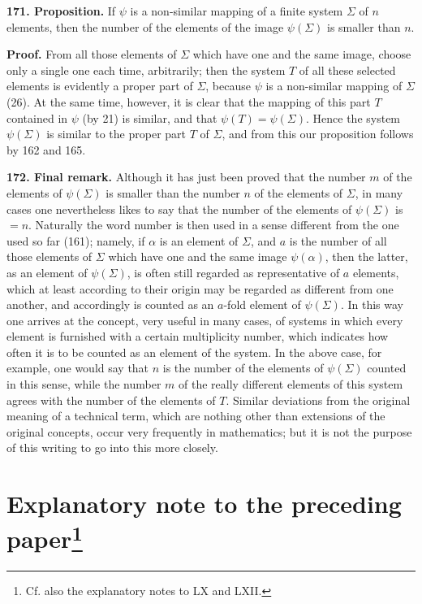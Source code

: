 \documentclass[11pt]{article}
\begin{document}
\noindent\textbf{171. Proposition.} If $\psi$ is a non-similar mapping of a finite system $\Sigma$ of $n$ elements, then the number of the elements of the image $\psi(\Sigma)$ is smaller than $n$.

\noindent\textbf{Proof.} From all those elements of $\Sigma$ which have one and the same image, choose only a single one each time, arbitrarily; then the system $T$ of all these selected elements is evidently a proper part of $\Sigma$, because $\psi$ is a non-similar mapping of $\Sigma$ (26). At the same time, however, it is clear that the mapping of this part $T$ contained in $\psi$ (by 21) is similar, and that $\psi(T)=\psi(\Sigma)$. Hence the system $\psi(\Sigma)$ is similar to the proper part $T$ of $\Sigma$, and from this our proposition follows by 162 and 165.

\noindent\textbf{172. Final remark.} Although it has just been proved that the number $m$ of the elements of $\psi(\Sigma)$ is smaller than the number $n$ of the elements of $\Sigma$, in many cases one nevertheless likes to say that the number of the elements of $\psi(\Sigma)$ is $=n$. Naturally the word number is then used in a sense different from the one used so far (161); namely, if $\alpha$ is an element of $\Sigma$, and $a$ is the number of all those elements of $\Sigma$ which have one and the same image $\psi(\alpha)$, then the latter, as an element of $\psi(\Sigma)$, is often still regarded as representative of $a$ elements, which at least according to their origin may be regarded as different from one another, and accordingly is counted as an $a$-fold element of $\psi(\Sigma)$. In this way one arrives at the concept, very useful in many cases, of systems in which every element is furnished with a certain multiplicity number, which indicates how often it is to be counted as an element of the system. In the above case, for example, one would say that $n$ is the number of the elements of $\psi(\Sigma)$ counted in this sense, while the number $m$ of the really different elements of this system agrees with the number of the elements of $T$. Similar deviations from the original meaning of a technical term, which are nothing other than extensions of the original concepts, occur very frequently in mathematics; but it is not the purpose of this writing to go into this more closely.

\renewcommand{\thefootnote}{*}
\section*{Explanatory note to the preceding paper\footnote{Cf. also the explanatory notes to LX and LXII.}}
\renewcommand{\thefootnote}{\arabic{footnote}}
\end{document}
